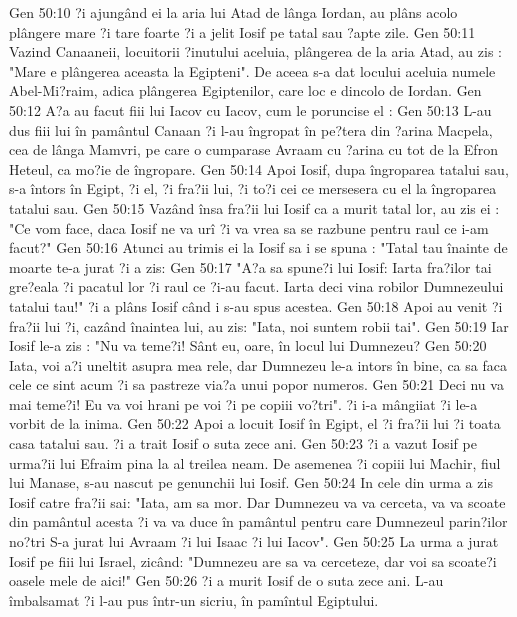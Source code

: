 Gen 50:10  ?i ajungând ei la aria lui Atad de lânga Iordan, au plâns acolo plângere mare ?i tare foarte ?i a jelit Iosif pe tatal sau ?apte zile.
Gen 50:11  Vazind Canaaneii, locuitorii ?inutului aceluia, plângerea de la aria Atad, au zis : "Mare e plângerea aceasta la Egipteni". De aceea s-a dat locului aceluia numele Abel-Mi?raim, adica plângerea Egiptenilor, care loc e dincolo de Iordan.
Gen 50:12  A?a au facut fiii lui Iacov cu Iacov, cum le poruncise el :
Gen 50:13  L-au dus fiii lui în pamântul Canaan ?i l-au îngropat în pe?tera din ?arina Macpela, cea de lânga Mamvri, pe care o cumparase Avraam cu ?arina cu tot de la Efron Heteul, ca mo?ie de îngropare.
Gen 50:14  Apoi Iosif, dupa îngroparea tatalui sau, s-a întors în Egipt, ?i el, ?i fra?ii lui, ?i to?i cei ce mersesera cu el la îngroparea tatalui sau.
Gen 50:15  Vazând însa fra?ii lui Iosif ca a murit tatal lor, au zis ei : "Ce vom face, daca Iosif ne va urî ?i va vrea sa se razbune pentru raul ce i-am facut?"
Gen 50:16  Atunci au trimis ei la Iosif sa i se spuna : "Tatal tau înainte de moarte te-a jurat ?i a zis:
Gen 50:17  "A?a sa spune?i lui Iosif: Iarta fra?ilor tai gre?eala ?i pacatul lor ?i raul ce ?i-au facut. Iarta deci vina robilor Dumnezeului tatalui tau!" ?i a plâns Iosif când i s-au spus acestea.
Gen 50:18  Apoi au venit ?i fra?ii lui ?i, cazând înaintea lui, au zis: "Iata, noi suntem robii tai".
Gen 50:19  Iar Iosif le-a zis : "Nu va teme?i! Sânt eu, oare, în locul lui Dumnezeu?
Gen 50:20  Iata, voi a?i uneltit asupra mea rele, dar Dumnezeu le-a intors în bine, ca sa faca cele ce sint acum ?i sa pastreze via?a unui popor numeros.
Gen 50:21  Deci nu va mai teme?i! Eu va voi hrani pe voi ?i pe copiii vo?tri". ?i i-a mângiiat ?i le-a vorbit de la inima.
Gen 50:22  Apoi a locuit Iosif în Egipt, el ?i fra?ii lui ?i toata casa tatalui sau. ?i a trait Iosif o suta zece ani.
Gen 50:23  ?i a vazut Iosif pe urma?ii lui Efraim pina la al treilea neam. De asemenea ?i copiii lui Machir, fiul lui Manase, s-au nascut pe genunchii lui Iosif.
Gen 50:24  In cele din urma a zis Iosif catre fra?ii sai: "Iata, am sa mor. Dar Dumnezeu va va cerceta, va va scoate din pamântul acesta ?i va va duce în pamântul pentru care Dumnezeul parin?ilor no?tri S-a jurat lui Avraam ?i lui Isaac ?i lui Iacov".
Gen 50:25  La urma a jurat Iosif pe fiii lui Israel, zicând: "Dumnezeu are sa va cerceteze, dar voi sa scoate?i oasele mele de aici!"
Gen 50:26  ?i a murit Iosif de o suta zece ani. L-au îmbalsamat ?i l-au pus într-un sicriu, în pamîntul Egiptului.


